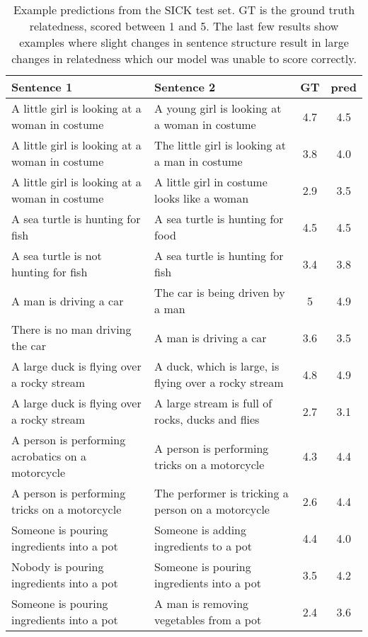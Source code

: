 \documentclass{article} \usepackage{nips15submit_e,times}
\begin{document}
\begin{table}
\scriptsize
\centering
\begin{tabular}{llcc}
\toprule \bf Sentence 1 & \bf Sentence 2 & \bf GT & \bf pred \\ \midrule
A little girl is looking at a woman in costume & A young girl is looking at a woman in costume & 4.7 & 4.5 \\
A little girl is looking at a woman in costume & The little girl is looking at a man in costume & 3.8 & 4.0 \\
A little girl is looking at a woman in costume & A little girl in costume looks like a woman & 2.9 & 3.5 \\ \midrule
A sea turtle is hunting for fish & A sea turtle is hunting for food & 4.5 & 4.5 \\
A sea turtle is not hunting for fish & A sea turtle is hunting for fish & 3.4 & 3.8 \\ \midrule 
A man is driving a car & The car is being driven by a man & 5 & 4.9 \\
There is no man driving the car & A man is driving a car & 3.6 & 3.5 \\ \midrule
A large duck is flying over a rocky stream & A duck, which is large, is flying over a rocky stream & 4.8 & 4.9 \\
A large duck is flying over a rocky stream & A large stream is full of rocks, ducks and flies & 2.7 & 3.1 \\ \midrule
A person is performing acrobatics on a motorcycle & A person is performing tricks on a motorcycle & 4.3 & 4.4 \\
A person is performing tricks on a motorcycle & The performer is tricking a person on a motorcycle & 2.6 & 4.4 \\ \midrule
Someone is pouring ingredients into a pot & Someone is adding ingredients to a pot & 4.4 & 4.0 \\
Nobody is pouring ingredients into a pot & Someone is pouring ingredients into a pot & 3.5 & 4.2 \\
Someone is pouring ingredients into a pot & A man is removing vegetables from a pot & 2.4 & 3.6 \\ \bottomrule

\end{tabular}
\caption{Example predictions from the SICK test set. GT is the ground truth relatedness, scored between 1 and 5. The last few results show examples where slight changes in sentence structure result in large changes in relatedness which our model was unable to score correctly. }
\label{tab:relatedness}
\end{table}
\end{document}
